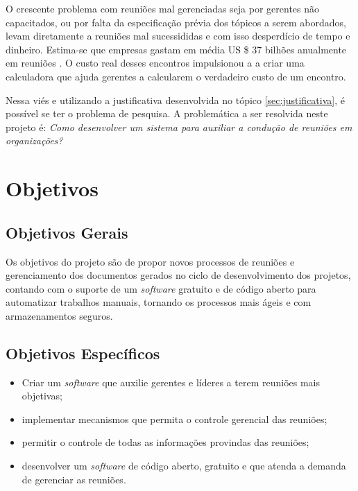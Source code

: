 O crescente problema com reuniões mal gerenciadas seja por gerentes não capacitados, ou por falta da especificação prévia dos tópicos a serem abordados, levam diretamente a reuniões mal sucessididas e com isso desperdício de tempo e dinheiro. Estima-se que empresas gastam em média US \$ 37 bilhões anualmente em reuniões \cite{baer}. O custo real desses encontros impulsionou a \cite{harvard} a criar uma calculadora que ajuda gerentes a calcularem o verdadeiro custo de um encontro.

Nessa viés e utilizando a justificativa desenvolvida no tópico \ref{sec:justificativa}, é possível se ter o problema de pesquisa. A problemática a ser resolvida neste projeto é: \textit{Como desenvolver um sistema para auxiliar a condução de reuniões em organizações?}

\section{Objetivos}
\label{sec:objetivos}

\subsection{Objetivos Gerais}
\label{sec:objetivos_gerais}

Os objetivos do projeto são de propor novos processos de reuniões e gerenciamento dos documentos gerados no ciclo de desenvolvimento dos projetos, contando com o suporte de um \textit{software} gratuito e de código aberto para automatizar trabalhos manuais, tornando os processos mais ágeis e com armazenamentos seguros.

\subsection{Objetivos Específicos}
\label{sec:objetivos_especificos}

\begin{itemize}
    \item Criar um \textit{software} que auxilie gerentes e líderes a terem reuniões mais objetivas;
    \item implementar mecanismos que permita o controle gerencial das reuniões;
    \item permitir o controle de todas as informações provindas das reuniões;
    \item desenvolver um \textit{software} de código aberto, gratuito e que atenda a demanda de gerenciar as reuniões.
\end{itemize}